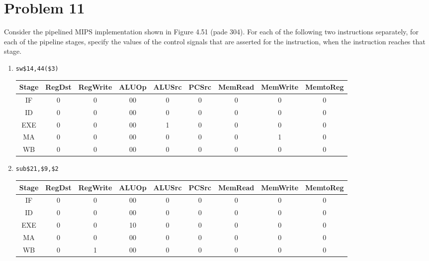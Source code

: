 \documentclass[10pt,letterpaper]{article}
\newcommand\tab[1][0.5cm]{\hspace*{#1}}
\begin{document}
\section{Problem 11}
Consider the pipelined MIPS implementation shown in Figure 4.51 (pade 304). For each of the following two instructions separately, for each of the pipeline stages, specify the values of the control signals that are asserted for the instruction, when the instruction reaches that stage.
\begin{enumerate}[label=\alph*.]
\item \texttt{sw\tab\$14,44(\$3)}
\begin{center}
\begin{tabular} { |c|c|c|c|c|c|c|c|c| }
\hline
Stage & RegDst & RegWrite & ALUOp & ALUSrc & PCSrc & MemRead & MemWrite & MemtoReg \\
\hline
IF & 0 & 0 & 00 & 0 & 0 & 0 & 0 & 0 \\
\hline
ID & 0 & 0 & 00 & 0 & 0 & 0 & 0 & 0 \\
\hline
EXE & 0 & 0 & 00 & 1 & 0 & 0 & 0 & 0 \\
\hline
MA & 0 & 0 & 00 & 0 & 0 & 0 & 1 & 0 \\
\hline
WB & 0 & 0 & 00 & 0 & 0 & 0 & 0 & 0 \\
\hline
\end{tabular}
\end{center}
\item \texttt{sub\tab\$21,\$9,\$2}
\begin{center}
\begin{tabular} { |c|c|c|c|c|c|c|c|c| }
\hline
Stage & RegDst & RegWrite & ALUOp & ALUSrc & PCSrc & MemRead & MemWrite & MemtoReg \\
\hline
IF & 0 & 0 & 00 & 0 & 0 & 0 & 0 & 0 \\
\hline
ID & 0 & 0 & 00 & 0 & 0 & 0 & 0 & 0 \\
\hline
EXE & 0 & 0 & 10 & 0 & 0 & 0 & 0 & 0 \\
\hline
MA & 0 & 0 & 00 & 0 & 0 & 0 & 0 & 0 \\
\hline
WB & 0 & 1 & 00 & 0 & 0 & 0 & 0 & 0 \\
\hline
\end{tabular}
\end{center}
\end{enumerate}
\end{document}

